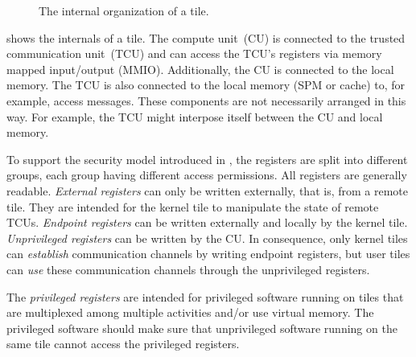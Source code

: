 \begin{figure}[h]
  \caption{The internal organization of a tile.}
  \label{fig:tileinternal}
\end{figure}

 shows the internals of a tile. The compute unit~(CU) is
connected to the trusted communication unit~(TCU) and can access the TCU's registers via memory
mapped input/output (MMIO). Additionally, the CU is connected to the local memory. The TCU is also
connected to the local memory (SPM or cache) to, for example, access messages. These components are
not necessarily arranged in this way. For example, the TCU might interpose itself between the CU and
local memory.

To support the security model introduced in , the registers are split into
different groups, each group having different access permissions. All registers are generally
readable. \emph{External registers} can only be written externally, that is, from a remote tile. They
are intended for the kernel tile to manipulate the state of remote TCUs. \emph{Endpoint registers} can
be written externally and locally by the kernel tile. \emph{Unprivileged registers} can be written by
the CU. In consequence, only kernel tiles can \emph{establish} communication channels by writing
endpoint registers, but user tiles can \emph{use} these communication channels through the
unprivileged registers.

 The \emph{privileged registers} are intended for privileged software running on tiles
that are multiplexed among multiple activities and/or use virtual memory. The privileged software should
make sure that unprivileged software running on the same tile cannot access the privileged registers.
\extend{}

